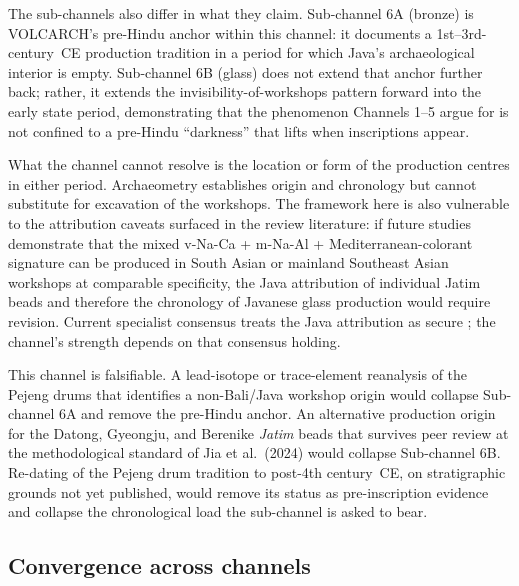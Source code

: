 \documentclass[12pt,a4paper]{article}
\begin{document}
The sub-channels also differ in what they claim. Sub-channel 6A (bronze) is VOLCARCH's pre-Hindu anchor within this channel: it documents a 1st--3rd-century~CE production tradition in a period for which Java's archaeological interior is empty. Sub-channel 6B (glass) does not extend that anchor further back; rather, it extends the invisibility-of-workshops pattern forward into the early state period, demonstrating that the phenomenon Channels 1--5 argue for is not confined to a pre-Hindu ``darkness'' that lifts when inscriptions appear.

What the channel cannot resolve is the location or form of the production centres in either period. Archaeometry establishes origin and chronology but cannot substitute for excavation of the workshops. The framework here is also vulnerable to the attribution caveats surfaced in the review literature: if future studies demonstrate that the mixed v-Na-Ca + m-Na-Al + Mediterranean-colorant signature can be produced in South Asian or mainland Southeast Asian workshops at comparable specificity, the Java attribution of individual Jatim beads and therefore the chronology of Javanese glass production would require revision. Current specialist consensus treats the Java attribution as secure \citep{lankton2008,jia_etal_2024}; the channel's strength depends on that consensus holding.

This channel is falsifiable. A lead-isotope or trace-element reanalysis of the Pejeng drums that identifies a non-Bali/Java workshop origin would collapse Sub-channel 6A and remove the pre-Hindu anchor. An alternative production origin for the Datong, Gyeongju, and Berenike \textit{Jatim} beads that survives peer review at the methodological standard of Jia et al.\ (2024) would collapse Sub-channel 6B. Re-dating of the Pejeng drum tradition to post-4th century~CE, on stratigraphic grounds not yet published, would remove its status as pre-inscription evidence and collapse the chronological load the sub-channel is asked to bear.


\subsection{Convergence across channels}
\label{sec:convergence}
\end{document}
